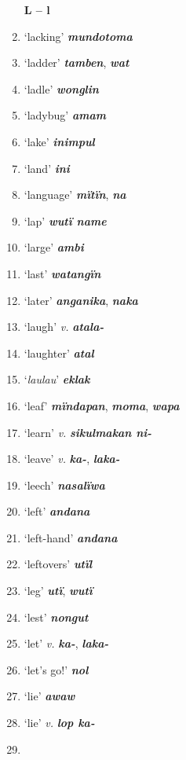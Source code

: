 \begin{enumerate}[noitemsep, label={}, align=left, widest=190, labelsep=1ex,leftmargin=*,itemindent=-10pt]
\newpage

\noindent \textbf{L – l}\\ \item

‘lacking’ \textbf{\textit{mundotoma}} \item
‘ladder’ \textbf{\textit{tamben}}, \textbf{\textit{wat}} \item
‘ladle’ \textbf{\textit{wonglin}} \item
‘ladybug’ \textbf{\textit{amam}} \item
‘lake’ \textbf{\textit{inimpul}} \item
‘land’ \textbf{\textit{ini}} \item
‘language’ \textbf{\textit{mïtïn}}, \textbf{\textit{na}} \item
‘lap’ \textbf{\textit{wutï name}} \item
‘large’ \textbf{\textit{ambi}} \item
‘last’ \textbf{\textit{watangïn}} \item
‘later’ \textbf{\textit{anganika}}, \textbf{\textit{naka}} \item
‘laugh’ \textit{v.} \textbf{\textit{atala-}} \item
‘laughter’ \textbf{\textit{atal}} \item
‘\textit{laulau}’ \textbf{\textit{eklak}} \item
‘leaf’ \textbf{\textit{mïndapan}}, \textbf{\textit{moma}}, \textbf{\textit{wapa}} \item
‘learn’ \textit{v.} \textbf{\textit{sikulmakan ni-}} \item
‘leave’ \textit{v.} \textbf{\textit{ka-}}, \textbf{\textit{laka-}} \item
‘leech’ \textbf{\textit{nasalïwa}} \item
‘left’ \textbf{\textit{andana}} \item
‘left-hand’ \textbf{\textit{andana}} \item
‘leftovers’ \textbf{\textit{utïl}} \item
‘leg’ \textbf{\textit{utï}}, \textbf{\textit{wutï}} \item
‘lest’ \textbf{\textit{nongut}} \item
‘let’ \textit{v.} \textbf{\textit{ka-}}, \textbf{\textit{laka-}} \item
‘let’s go!’ \textbf{\textit{nol}} \item
‘lie’ \textbf{\textit{awaw}} \item
‘lie’ \textit{v.} \textbf{\textit{lop ka-}} \item

\end{enumerate}
